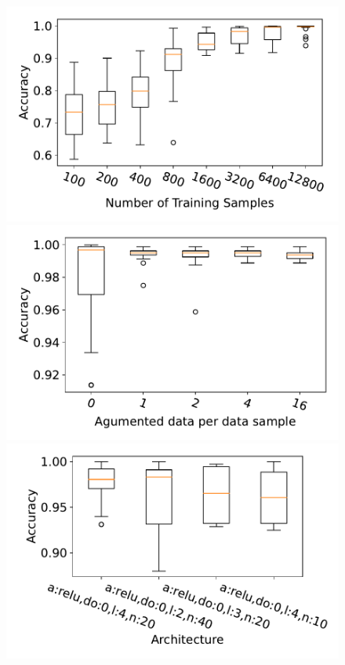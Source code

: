 \documentclass[prl,twocolumn]{revtex4-1}
\begin{document}
\newcommand{\figwidth}{ 0.455 \textwidth}
\begin{figure}[!tb]
  \centering
  \includegraphics[width=\figwidth]{task_1/figures/num_train_box_30_2.pdf}
  \hskip 0.5mm
  \includegraphics[width=\figwidth]{task_1/figures/ag_train_box_30_2.pdf}
  \vskip 0.5mm
  \includegraphics[width=\figwidth]{task_1/figures/architecture_box_30_2.pdf}

\end{figure}
\end{document}
